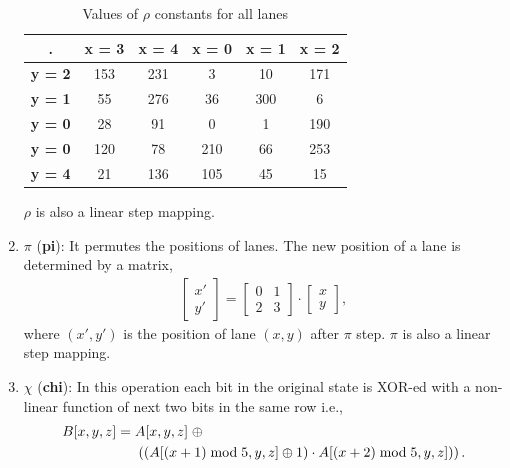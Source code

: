 \begin{enumerate}
        \begin{table}[h!]
            \begin{center}
                \begin{tabular}{c|c|c|c|c|c}
                    \textbf{.} & \textbf{x = 3} & \textbf{x = 4} & \textbf{x = 0} & \textbf{x = 1} & \textbf{x = 2}\\ %
                    \hline
                    \textbf{y = 2} & 153 & 231 & 3 & 10 & 171\\ %
                    \hline
                    \textbf{y = 1} & 55 & 276 & 36 & 300 & 6\\ %
                    \hline
                    \textbf{y = 0} & 28 & 91 & 0 & 1 & 190\\ %
                    \hline
                    \textbf{y = 0} & 120 & 78 & 210 & 66 & 253\\ %
                    \hline
                    \textbf{y = 4} & 21 & 136 & 105 & 45 & 15\\ %
                    \hline
                \end{tabular}
                \caption{Values of $\rho$ constants for all lanes}\label{tab4}
            \end{center}
        \end{table}                                                                 
        $\rho$ is also a linear step mapping.

    \vskip5pt
    \item $\pi$ ({\bf pi}): It permutes the positions of lanes. The new position of a lane is determined by a matrix, 
    \begin{align}
    \begin{bmatrix} x'\\ y'\end{bmatrix} = 
    \begin{bmatrix} 0 & 1 \\ 2 &  3 \end{bmatrix} \cdot \begin{bmatrix} x\\ y\end{bmatrix},
    \end{align}
    where $(x', y')$ is the position of lane $(x, y)$ after $\pi$ step.
        $\pi$ is also a linear step mapping.
    \vskip5pt
    \item $\chi$ ({\bf chi}): In this operation each bit in the original state is XOR-ed with a non-linear function of next two bits in the same row i.e.,
    \begin{align}\nonumber
        B[x, y, z] &=  A[x, y, z] \;\oplus \\
        & \hspace{0.5cm} \left( \left(A[ (x + 1 )\bmod 5, y, z] \oplus 1\right) \cdot  A[ (x + 2) \bmod 5, y, z] ) \right).
    \end{align}
    

\end{enumerate}
